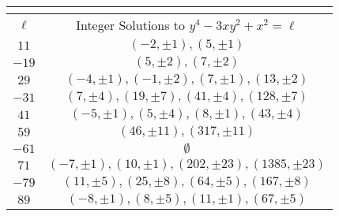\documentclass[12pt]{amsart}
\numberwithin{equation}{section}
\begin{document}
\begingroup
\setlength{\tabcolsep}{5pt} %
\renewcommand{\arraystretch}{1.9}
\begin{center} 
\begin{table}[!ht]
\begin{tabular}{|c|c|}
\multicolumn{2}{c}{} \\ \hline
$\ell$ & Integer Solutions to $y^4-3xy^2+x^2=\ell$  \\ \hline \hline
$11$ & $(-2,\pm 1),(5,\pm 1)$\\ \hline
$-19$ & $(5,\pm 2),(7,\pm 2)$\\ \hline
$29$ & $(-4,\pm 1),(-1,\pm 2),(7,\pm 1),(13,\pm 2)$\\ \hline
$-31$ & $(7,\pm 4),(19,\pm 7),(41,\pm 4),(128,\pm 7)$\\ \hline
$41$ & $(-5,\pm 1),(5,\pm 4),(8,\pm 1),(43,\pm 4)$\\ \hline
$59$ & $(46,\pm 11),(317,\pm 11)$\\ \hline
$-61$ & $\emptyset$\\ \hline
$71$ & $(-7,\pm 1),(10,\pm 1),(202,\pm 23),(1385,\pm 23)$\\ \hline
$-79$ & $(11,\pm 5),(25,\pm 8),(64,\pm 5),(167,\pm 8)$\\ \hline
$89$ & $(-8,\pm 1),(8,\pm 5),(11,\pm 1),(67,\pm 5)$\\ \hline
\end{tabular}
\medskip
{}
\label{Weight2}
\end{table}
\end{center}
\endgroup
\end{document}
